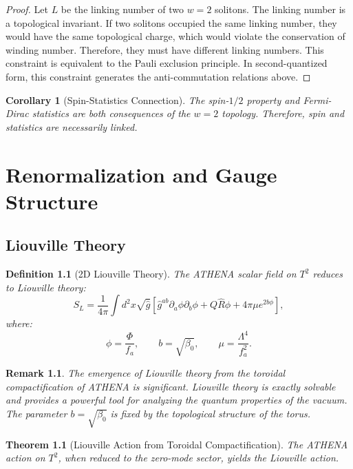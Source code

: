 \documentclass[12pt,oneside]{book}
\newtheorem{definition}{Definition}[chapter]
\newtheorem{theorem}{Theorem}[chapter]
\newtheorem{corollary}{Corollary}[chapter]
\newtheorem{remark}{Remark}[chapter]
\begin{document}
\begin{proof}
Let $L$ be the linking number of two $w = 2$ solitons. The linking number is a topological invariant. If two solitons occupied the same linking number, they would have the same topological charge, which would violate the conservation of winding number. Therefore, they must have different linking numbers. This constraint is equivalent to the Pauli exclusion principle. In second-quantized form, this constraint generates the anti-commutation relations above.
\end{proof}

\begin{corollary}[Spin-Statistics Connection]
The spin-$1/2$ property and Fermi-Dirac statistics are both consequences of the $w = 2$ topology. Therefore, spin and statistics are necessarily linked.
\end{corollary}

\chapter{Renormalization and Gauge Structure}

\section{Liouville Theory}

\begin{definition}[2D Liouville Theory]
The ATHENA scalar field on $T^2$ reduces to Liouville theory:
\[
S_L = \frac{1}{4\pi}\int d^2x \sqrt{\hat{g}} \left[\hat{g}^{ab}\partial_a\phi\partial_b\phi + Q\hat{R}\phi + 4\pi\mu e^{2b\phi}\right],
\]
where:
\[
\phi = \frac{\Phi}{f_a}, \qquad b = \sqrt{\beta_0}, \qquad \mu = \frac{\Lambda^4}{f_a^2}.
\]
\end{definition}

\begin{remark}
The emergence of Liouville theory from the toroidal compactification of ATHENA is significant. Liouville theory is exactly solvable and provides a powerful tool for analyzing the quantum properties of the vacuum. The parameter $b = \sqrt{\beta_0}$ is fixed by the topological structure of the torus.
\end{remark}

\begin{theorem}[Liouville Action from Toroidal Compactification]
The ATHENA action on $T^2$, when reduced to the zero-mode sector, yields the Liouville action.
\end{theorem}
\end{document}
